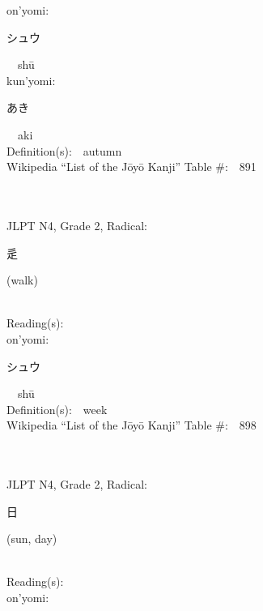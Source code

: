 \begin{multicols}{2}
{\hspace*{1em}}on'yomi:\ \ \\
{\hspace*{2em}}{\begin{CJK}{UTF8}{min} シュウ \end{CJK}}\ \ sh\=u\ \ \\
{\hspace*{1em}}kun'yomi:\ \ \\
{\hspace*{2em}}{\begin{CJK}{UTF8}{min} あき \end{CJK}}\ \ aki\ \ \\
Definition(s):\ \ autumn \\
Wikipedia ``List of the J\=oy\=o Kanji'' Table \#:\ \ 891 \\
\ \ \\
{\fontsize{34pt}{40pt}  }\ \ \\  %
{JLPT N4, Grade 2, Radical:\ \ {\begin{CJK}{UTF8}{min} 辵 \end{CJK}} (walk) } \\
Reading(s):\ \ \\
{\hspace*{1em}}on'yomi:\ \ \\
{\hspace*{2em}}{\begin{CJK}{UTF8}{min} シュウ \end{CJK}}\ \ sh\=u\ \ \\
Definition(s):\ \ week \\
Wikipedia ``List of the J\=oy\=o Kanji'' Table \#:\ \ 898 \\
\ \ \\
{\fontsize{34pt}{40pt}  }\ \ \\  %
{JLPT N4, Grade 2, Radical:\ \ {\begin{CJK}{UTF8}{min} 日 \end{CJK}} (sun, day) } \\
Reading(s):\ \ \\
{\hspace*{1em}}on'yomi:\ \ \\

\end{multicols}
